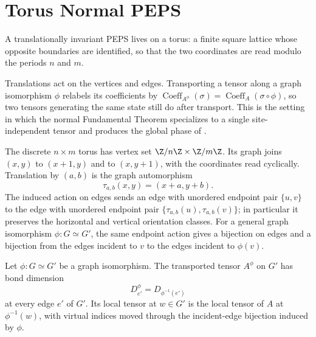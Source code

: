 \section{Torus Normal PEPS}\label{sec:peps_torus}

A translationally invariant PEPS lives on a torus: a finite square lattice whose
opposite boundaries are identified, so that the two coordinates are read modulo
the periods $n$ and $m$.
\begin{center}
    \TNPEPSTorusGeometry
\end{center}
Translations act on the vertices and edges. Transporting a tensor along a graph
isomorphism $\phi$ relabels its coefficients by
$\operatorname{Coeff}_{A^\phi}(\sigma)=\operatorname{Coeff}_A(\sigma\circ\phi)$,
so two tensors generating the same state still do after transport. This is the
setting in which the normal Fundamental Theorem specializes to a single
site-independent tensor and produces the global phase of
\cite[Theorem~3]{Molnar2018NormalPEPS}.

\begin{definition}%
    \label{def:peps_torus_geometry_translation}
    \leanok
    The discrete $n\times m$ torus has vertex set $\Z/n\Z\times\Z/m\Z$.
    Its graph joins $(x,y)$ to $(x+1,y)$ and to $(x,y+1)$, with the
    coordinates read cyclically. Translation by $(a,b)$ is the graph
    automorphism
    \[
        \tau_{a,b}(x,y)=(x+a,y+b).
    \]
    The induced action on edges sends an edge with unordered endpoint pair
    $\{u,v\}$ to the edge with unordered endpoint pair
    $\{\tau_{a,b}(u),\tau_{a,b}(v)\}$; in particular it preserves the
    horizontal and vertical orientation classes. For a general graph
    isomorphism $\phi:G\simeq G'$, the same endpoint action gives a
    bijection on edges and a bijection from the edges incident to $v$ to
    the edges incident to $\phi(v)$.
\end{definition}

\begin{definition}%
    \label{def:peps_tensor_transport}
    \leanok
    Let $\phi:G\simeq G'$ be a graph isomorphism. The transported tensor
    $A^\phi$ on $G'$ has bond dimension
    \[
        D^\phi_{e'}=D_{\phi^{-1}(e')}
    \]
    at every edge $e'$ of $G'$. Its local tensor at $w\in G'$ is the local
    tensor of $A$ at $\phi^{-1}(w)$, with virtual indices moved through the
    incident-edge bijection induced by $\phi$.
\end{definition}

